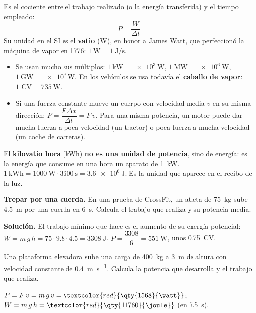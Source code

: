 \begin{definition}
    Es el cociente entre el trabajo realizado (o la energía transferida) y el tiempo empleado:
    \[ P = \frac{W}{\Delta t} \]
    Su unidad en el SI es el \textbf{vatio} (W), en honor a James Watt, que perfeccionó la máquina de vapor en 1776:
    \(\qty{1}{\watt} = \qty{1}{\joule\per\s}\).
\end{definition}

\begin{itemize}
    \item Se usan mucho sus múltiplos: \(\qty{1}{\kilo\watt} = \qty{e3}{\watt}\), \(\qty{1}{\mega\watt} = \qty{e6}{\watt}\),
    \(\qty{1}{\giga\watt} = \qty{e9}{\watt}\). En los vehículos se usa todavía el \textbf{caballo de vapor}: \(\text{1 CV} = \qty{735}{\watt}\).
    \item Si una fuerza constante mueve un cuerpo con velocidad media \(v\) en su misma dirección:
    \(P = \dfrac{F\,\Delta x}{\Delta t} = F\,v\). Para una misma potencia, un motor puede dar mucha fuerza a poca velocidad (un tractor)
    o poca fuerza a mucha velocidad (un coche de carreras).
\end{itemize}

\begin{remark}
    El \textbf{kilovatio hora} (kWh) \textbf{no es una unidad de potencia}, sino de energía: es la energía que consume en una hora un
    aparato de \qty{1}{\kilo\watt}. \(\qty{1}{\kilo\watt\hour} = \qty{1000}{\watt} \cdot \qty{3600}{\s} = \qty{3.6e6}{\joule}\). Es la
    unidad que aparece en el recibo de la luz.
\end{remark}

\begin{example}
    \textbf{Trepar por una cuerda.} En una prueba de CrossFit, un atleta de \qty{75}{\kg} sube \qty{4.5}{\m} por una cuerda en
    \qty{6}{\s}. Calcula el trabajo que realiza y su potencia media.

    \textbf{Solución.} El trabajo mínimo que hace es el aumento de su energía potencial:
    \(W = m\,g\,h = 75 \cdot \num{9.8} \cdot \num{4.5} = \qty{3308}{\joule}\). \(P = \dfrac{3308}{6} = \qty{551}{\watt}\), unos
    \num{0.75}~CV.
\end{example}

\begin{exercise}
    Una plataforma elevadora sube una carga de \qty{400}{\kg} a \qty{3}{\m} de altura con velocidad constante de \qty{0.4}{\m\per\s}.
    Calcula la potencia que desarrolla y el trabajo que realiza.
    \begin{solu}
        \(P = F\,v = m\,g\,v = \textcolor{red}{\qty{1568}{\watt}}\); \(W = m\,g\,h = \textcolor{red}{\qty{11760}{\joule}}\) (en \qty{7.5}{\s}).
    \end{solu}
\end{exercise}

